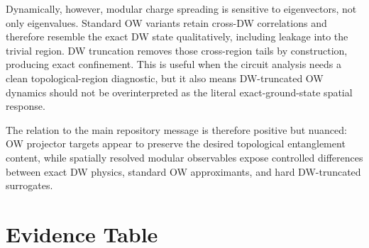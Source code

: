 \documentclass[aps,prb,onecolumn,nofootinbib,superscriptaddress]{revtex4-2}
\begin{document}
Dynamically, however, modular charge spreading is sensitive to eigenvectors, not only eigenvalues.  Standard OW variants retain cross-DW correlations and therefore resemble the exact DW state qualitatively, including leakage into the trivial region.  DW truncation removes those cross-region tails by construction, producing exact confinement.  This is useful when the circuit analysis needs a clean topological-region diagnostic, but it also means DW-truncated OW dynamics should not be overinterpreted as the literal exact-ground-state spatial response.

The relation to the main repository message is therefore positive but nuanced: OW projector targets appear to preserve the desired topological entanglement content, while spatially resolved modular observables expose controlled differences between exact DW physics, standard OW approximants, and hard DW-truncated surrogates.

\section{Evidence Table}
\end{document}
